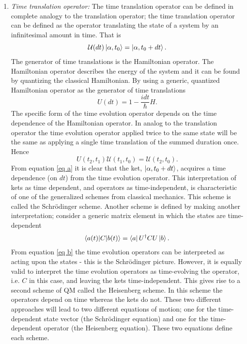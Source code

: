 \begin{enumerate}
	\item \emph{Time translation operator:}\newline
	The time translation operator can be defined in complete analogy to the translation operator; the time translation operator can be defined as the operator translating the state of a system by an infinitesimal amount in time. That is
	\begin{equation}
		\mathcal{U}(dt)\ket{\alpha,t_0}=\ket{\alpha,t_0+dt}.
		\label{eq a}
	\end{equation} 
	The generator of time translations is the Hamiltonian operator. The Hamiltonian operator describes the energy of the system and it can be found by quantizing the classical Hamiltonian. By using a generic, quantized Hamiltonian operator as the generator of time translations 
	\begin{equation}
		U(dt)=1-\frac{idt}{\hbar}H.
		\label{trans2}
	\end{equation} 
	The specific form of the time evolution operator depends on the time dependence of the Hamiltonian operator. 
	In analog to the translation operator the time evolution operator applied twice to the same state will be the same as applying a single time translation of the summed duration once. Hence
	\begin{equation}
		U(t_2,t_1)\mathcal{U}(t_1,t_0)=\mathcal{U}(t_2,t_0).
		\label{ttrans}
	\end{equation} 
	From equation \eqref{eq a} it is clear that the ket, $\ket{\alpha,t_0+dt}$, acquires a time dependence (on $dt$) from the time evolution operator. This interpretation of kets as time dependent, and operators as time-independent, is characteristic of one of the generalized schemes from classical mechanics. This scheme is called the Schrödinger scheme. Another scheme is defined by making another interpretation; consider a generic matrix element in which the states are time-dependent
	\begin{equation}
		\braket{a(t)|C|b(t)}=\bra{a}U^\dagger CU\ket{b}.
		\label{eq b}
	\end{equation} 
	From equation \eqref{eq b} the time evolution operators can be interpreted as acting upon the states - this is the Schrödinger picture. However, it is equally valid to interpret the time evolution operators as time-evolving the operator, i.e. $C$ in this case, and leaving the kets time-independent. This gives rise to a second scheme of QM called the Heisenberg scheme. In this scheme the operators depend on time whereas the kets do not. These two different approaches will lead to two different equations of motion; one for the time-dependent state vector (the Schrödinger equation) and one for the time-dependent operator (the Heisenberg equation). These two equations define each scheme.
\end{enumerate}

